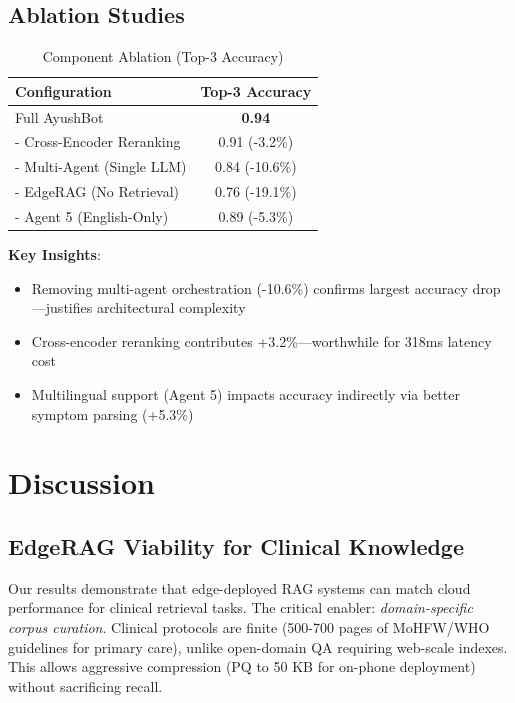 \documentclass[conference,compsoc]{IEEEtran}
\begin{document}
\subsection{Ablation Studies}

\begin{table}[h]
\centering
\caption{Component Ablation (Top-3 Accuracy)}
\label{tab:ablation}
\footnotesize
\begin{tabular}{@{}lc@{}}
\toprule
\textbf{Configuration} & \textbf{Top-3 Accuracy} \\ \midrule
Full AyushBot & \textbf{0.94} \\
- Cross-Encoder Reranking & 0.91 (-3.2\%) \\
- Multi-Agent (Single LLM) & 0.84 (-10.6\%) \\
- EdgeRAG (No Retrieval) & 0.76 (-19.1\%) \\
- Agent 5 (English-Only) & 0.89 (-5.3\%) \\
\bottomrule
\end{tabular}
\end{table}

\textbf{Key Insights}:
\begin{itemize}
    \item Removing multi-agent orchestration (-10.6\%) confirms largest accuracy drop—justifies architectural complexity
    \item Cross-encoder reranking contributes +3.2\%—worthwhile for 318ms latency cost
    \item Multilingual support (Agent 5) impacts accuracy indirectly via better symptom parsing (+5.3\%)
\end{itemize}

\section{Discussion}

\subsection{EdgeRAG Viability for Clinical Knowledge}

Our results demonstrate that edge-deployed RAG systems can match cloud performance for clinical retrieval tasks. The critical enabler: \textit{domain-specific corpus curation}. Clinical protocols are finite (500-700 pages of MoHFW/WHO guidelines for primary care), unlike open-domain QA requiring web-scale indexes. This allows aggressive compression (PQ to 50 KB for on-phone deployment) without sacrificing recall.
\end{document}
